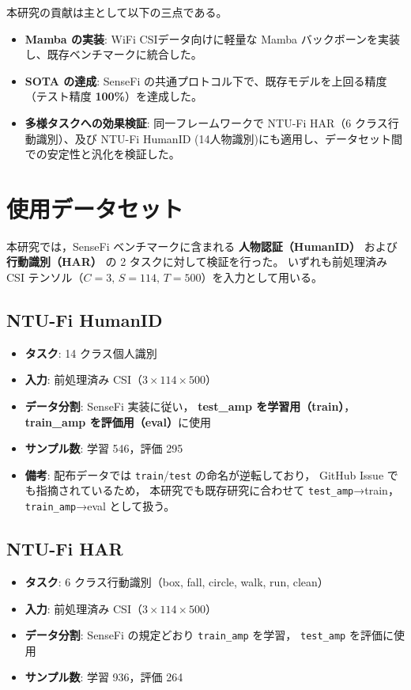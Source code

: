 \documentclass[11pt]{ltjsarticle}
\begin{document}
本研究の貢献は主として以下の三点である。
\begin{itemize}
  \item \textbf{Mamba の実装}: WiFi CSIデータ向けに軽量な Mamba バックボーンを実装し、既存ベンチマークに統合した。
  \item \textbf{SOTA の達成}: SenseFi の共通プロトコル下で、既存モデルを上回る精度（テスト精度 \textbf{100\%}）を達成した。
  \item \textbf{多様タスクへの効果検証}: 同一フレームワークで NTU-Fi HAR（6 クラス行動識別）、及び NTU-Fi HumanID (14人物識別)にも適用し、データセット間での安定性と汎化を検証した。
\end{itemize}


\section{使用データセット}
本研究では，SenseFi ベンチマークに含まれる
\textbf{人物認証（HumanID）} および
\textbf{行動識別（HAR）} の 2 タスクに対して検証を行った。
いずれも前処理済み CSI テンソル（\(C=3,\,S=114,\,T=500\)）を入力として用いる。

\subsection*{NTU-Fi HumanID}
\begin{itemize}
  \item \textbf{タスク}: 14 クラス個人識別
  \item \textbf{入力}: 前処理済み CSI（\(3\times114\times500\)）
  \item \textbf{データ分割}: SenseFi 実装に従い，
        \textbf{test\_amp を学習用（train）}，
        \textbf{train\_amp を評価用（eval）}に使用
  \item \textbf{サンプル数}: 学習 546，評価 295
  \item \textbf{備考}: 配布データでは
        \texttt{train}/\texttt{test} の命名が逆転しており，
        GitHub Issue でも指摘されているため，
        本研究でも既存研究に合わせて
        \texttt{test\_amp}→train，
        \texttt{train\_amp}→eval として扱う。
\end{itemize}

\subsection*{NTU-Fi HAR}
\begin{itemize}
  \item \textbf{タスク}: 6 クラス行動識別（box, fall, circle, walk, run, clean）
  \item \textbf{入力}: 前処理済み CSI（\(3\times114\times500\)）
  \item \textbf{データ分割}: SenseFi の規定どおり
        \texttt{train\_amp} を学習，
        \texttt{test\_amp} を評価に使用
  \item \textbf{サンプル数}: 学習 936，評価 264
\end{itemize}
\end{document}
